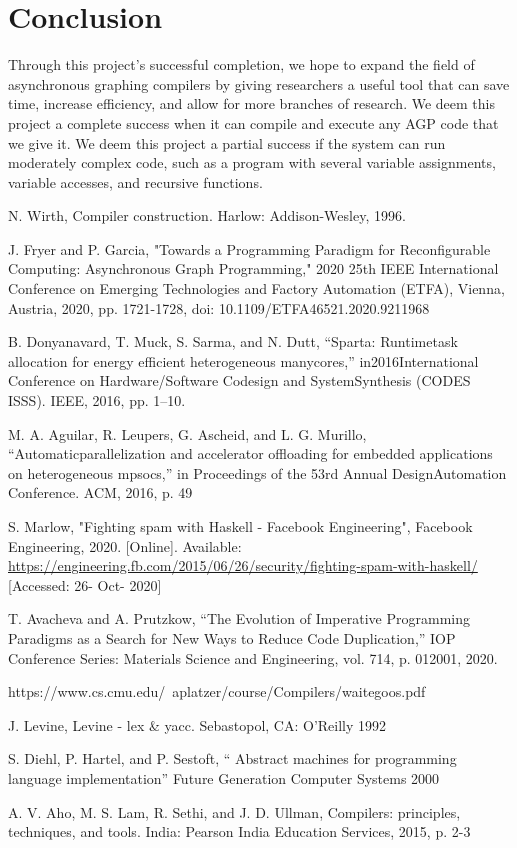\documentclass[11pt]{article}
\begin{document}
\section{Conclusion}

Through this project’s successful completion, we hope to expand the field of asynchronous graphing compilers by giving researchers a useful tool that can save time, increase efficiency, and allow for more branches of research. We deem this project a complete success when it can compile and execute any AGP code that we give it. We deem this project a partial success if the system can run moderately complex code, such as a program with several variable assignments, variable accesses, and recursive functions. 

\pagebreak

\begin{thebibliography}{9}

\bibitem{} 
N. Wirth, Compiler construction. Harlow: Addison-Wesley, 1996.

\bibitem{} 
J. Fryer and P. Garcia, "Towards a Programming Paradigm for Reconfigurable Computing: Asynchronous Graph Programming," 2020 25th IEEE International Conference on Emerging Technologies and Factory Automation (ETFA), Vienna, Austria, 2020, pp. 1721-1728, doi: 10.1109/ETFA46521.2020.9211968

\bibitem{}
B. Donyanavard, T. Muck, S. Sarma, and N. Dutt, “Sparta: Runtimetask allocation for energy efficient heterogeneous manycores,” in2016International Conference on Hardware/Software Codesign and SystemSynthesis (CODES  ISSS). IEEE, 2016, pp. 1–10.

\bibitem{}
M. A. Aguilar, R. Leupers, G. Ascheid, and L. G. Murillo, “Automaticparallelization and accelerator offloading for embedded applications on heterogeneous mpsocs,” in Proceedings of the 53rd Annual DesignAutomation Conference. ACM, 2016, p. 49

\bibitem{} 
S. Marlow, "Fighting spam with Haskell - Facebook Engineering", Facebook Engineering, 2020. [Online]. Available: \url{https://engineering.fb.com/2015/06/26/security/fighting-spam-with-haskell/} 
[Accessed: 26- Oct- 2020]

\bibitem{}
T. Avacheva and A. Prutzkow, “The Evolution of Imperative Programming Paradigms as a Search for New Ways to Reduce Code Duplication,” IOP Conference Series: Materials Science and Engineering, vol. 714, p. 012001, 2020.

\bibitem{}
https://www.cs.cmu.edu/~aplatzer/course/Compilers/waitegoos.pdf

\bibitem{}
J. Levine,  Levine - lex \& yacc. Sebastopol, CA: O’Reilly 1992

\bibitem{}
S. Diehl, P. Hartel, and P. Sestoft, “ Abstract machines for programming language implementation” Future Generation Computer Systems 2000


\bibitem{}
A. V. Aho, M. S. Lam, R. Sethi, and J. D. Ullman, Compilers: principles, techniques, and tools. India: Pearson India Education Services, 2015, p. 2-3



\end{thebibliography}
\end{document}
